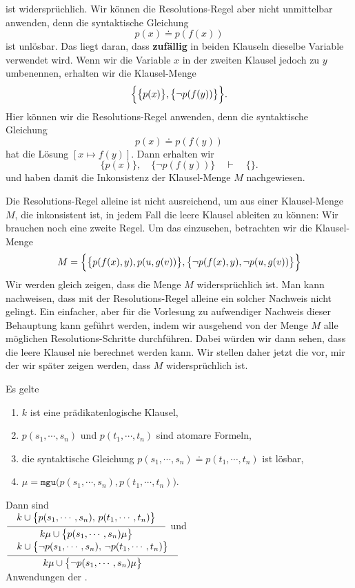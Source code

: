 ist widersprüchlich.  Wir können die Resolutions-Regel aber nicht unmittelbar anwenden,
denn die syntaktische Gleichung 
\[ p(x) \doteq p(f(x)) \]
ist unlösbar.  Das liegt daran, dass \textbf{zufällig} in beiden Klauseln dieselbe Variable
verwendet wird.  Wenn wir die Variable $x$ in der zweiten Klausel jedoch zu $y$ umbenennen, erhalten
wir die Klausel-Menge 
\[ \Bigl\{ \bigl\{ p(x) \bigr\}, \bigl\{ \neg p(f(y)) \bigr\} \Bigr\}. \]
Hier können wir die Resolutions-Regel anwenden, denn die syntaktische Gleichung 
\[ p(x) \doteq p(f(y)) \]
hat die Lösung $[x \mapsto f(y)]$.  Dann erhalten wir 
\[ \bigl\{ p(x) \bigr\}, \quad \bigl\{ \neg p(f(y)) \bigr\} \quad \vdash \quad \{\}. \]
und haben damit die Inkonsistenz der Klausel-Menge $M$ nachgewiesen.

\noindent
Die Resolutions-Regel alleine ist nicht ausreichend, um aus einer Klausel-Menge $M$, die
inkonsistent ist, in 
jedem Fall die leere Klausel ableiten zu können: Wir brauchen noch eine zweite Regel.
Um das einzusehen, betrachten wir die Klausel-Menge 
\[ M = \Bigl\{ \bigl\{p(f(x),y), p(u,g(v))\bigr\}, 
               \bigl\{\neg p(f(x),y), \neg p(u,g(v))\bigr\} \Bigr\} 
\]
Wir werden gleich zeigen, dass die Menge $M$ widersprüchlich ist.  Man kann nachweisen,
dass mit der Resolutions-Regel alleine ein solcher Nachweis nicht gelingt.
Ein einfacher, aber für die Vorlesung zu aufwendiger Nachweis dieser Behauptung kann
geführt werden, indem wir ausgehend von der Menge $M$ alle möglichen Resolutions-Schritte
durchführen.  Dabei würden wir dann sehen, dass die leere Klausel nie berechnet werden kann.
Wir stellen daher jetzt die
 vor, mir der wir später zeigen werden, dass $M$ widersprüchlich
ist.


\begin{Definition}  Es gelte 
  \begin{enumerate}
  \item $k$ ist  eine prädikatenlogische Klausel,
  \item $p(s_1,\cdots,s_n)$ und $p(t_1,\cdots,t_n)$ sind atomare Formeln,
  \item die syntaktische Gleichung $p(s_1,\cdots,s_n)  \doteq p(t_1,\cdots,t_n)$ ist lösbar, 
  \item $\mu = \mathtt{mgu}\bigl(p(s_1,\cdots,s_n), p(t_1,\cdots,t_n)\bigr)$.
  \end{enumerate}
  Dann sind \\[0.3cm]
  \hspace*{0.8cm}
  $\schluss{k \cup \bigl\{p(s_1,\cdots,s_n),\, p(t_1,\cdots,t_n)\bigl\}}{k\mu \cup \bigl\{p(s_1,\cdots,s_n)\mu\bigr\} }$ 
  \quad und \quad
  $\schluss{k \cup \bigl\{ \neg p(s_1,\cdots,s_n),\, \neg p(t_1,\cdots,t_n)\bigl\}}{k\mu \cup \bigl\{\neg p(s_1,\cdots,s_n)\mu\bigr\} }$ 
  \\[0.3cm]
  Anwendungen der .
  \eox
\end{Definition}

